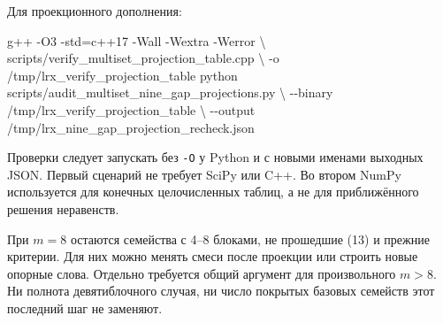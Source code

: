 \documentclass[
  11pt,
  a4paper,
]{article}
\newenvironment{Shaded}{}{}
\newcommand{\AttributeTok}[1]{\textcolor[rgb]{0.49,0.56,0.16}{#1}}
\newcommand{\DataTypeTok}[1]{\textcolor[rgb]{0.56,0.13,0.00}{#1}}
\newcommand{\ExtensionTok}[1]{#1}
\newcommand{\NormalTok}[1]{#1}
\newcommand{\OperatorTok}[1]{\textcolor[rgb]{0.40,0.40,0.40}{#1}}
\begin{document}
Для проекционного дополнения:

\begin{Shaded}
\begin{Highlighting}[]
\ExtensionTok{g++} \AttributeTok{{-}O3} \AttributeTok{{-}std}\OperatorTok{=}\NormalTok{c++17 }\AttributeTok{{-}Wall} \AttributeTok{{-}Wextra} \AttributeTok{{-}Werror} \DataTypeTok{\textbackslash{}}
\NormalTok{  scripts/verify\_multiset\_projection\_table.cpp }\DataTypeTok{\textbackslash{}}
  \AttributeTok{{-}o}\NormalTok{ /tmp/lrx\_verify\_projection\_table}
\ExtensionTok{python}\NormalTok{ scripts/audit\_multiset\_nine\_gap\_projections.py }\DataTypeTok{\textbackslash{}}
  \AttributeTok{{-}{-}binary}\NormalTok{ /tmp/lrx\_verify\_projection\_table }\DataTypeTok{\textbackslash{}}
  \AttributeTok{{-}{-}output}\NormalTok{ /tmp/lrx\_nine\_gap\_projection\_recheck.json}
\end{Highlighting}
\end{Shaded}

Проверки следует запускать без \texttt{-O} у Python и с новыми именами
выходных JSON. Первый сценарий не требует SciPy или C++. Во втором NumPy
используется для конечных целочисленных таблиц, а не для приближённого
решения неравенств.

При \(m=8\) остаются семейства с 4--8 блоками, не прошедшие (13) и
прежние критерии. Для них можно менять смеси после проекции или строить
новые опорные слова. Отдельно требуется общий аргумент для произвольного
\(m>8\). Ни полнота девятиблочного случая, ни число покрытых базовых
семейств этот последний шаг не заменяют.
\end{document}
